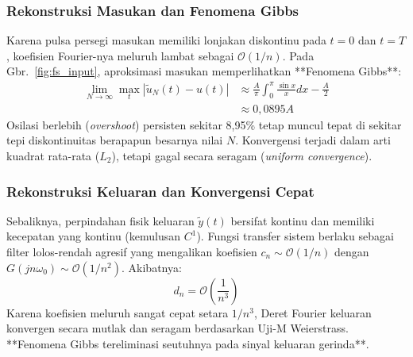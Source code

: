 \documentclass[journal]{IEEEtran}
\begin{document}
\subsubsection{Rekonstruksi Masukan dan Fenomena Gibbs}
Karena pulsa persegi masukan memiliki lonjakan diskontinu pada $t = 0$ dan $t = T$, koefisien Fourier-nya meluruh lambat sebagai $\mathcal{O}(1/n)$. Pada Gbr.~\ref{fig:fs_input}, aproksimasi masukan memperlihatkan **Fenomena Gibbs**:
\begin{align}
    \lim_{N \to \infty} \max_{t} |\tilde{u}_N(t) - u(t)| &\approx \frac{A}{\pi} \int_0^\pi \frac{\sin x}{x} dx - \frac{A}{2} \nonumber \\
    &\approx 0{,}0895 A
\end{align}
Osilasi berlebih (\textit{overshoot}) persisten sekitar 8,95\% tetap muncul tepat di sekitar tepi diskontinuitas berapapun besarnya nilai $N$. Konvergensi terjadi dalam arti kuadrat rata-rata ($L_2$), tetapi gagal secara seragam (\textit{uniform convergence}).

\subsubsection{Rekonstruksi Keluaran dan Konvergensi Cepat}
Sebaliknya, perpindahan fisik keluaran $\tilde{y}(t)$ bersifat kontinu dan memiliki kecepatan yang kontinu (kemulusan $C^1$). Fungsi transfer sistem berlaku sebagai filter lolos-rendah agresif yang mengalikan koefisien $c_n \sim \mathcal{O}(1/n)$ dengan $G(j n \omega_0) \sim \mathcal{O}(1/n^2)$. Akibatnya:
\begin{equation}
    d_n = \mathcal{O}\left(\frac{1}{n^3}\right)
\end{equation}
Karena koefisien meluruh sangat cepat setara $1/n^3$, Deret Fourier keluaran konvergen secara mutlak dan seragam berdasarkan Uji-M Weierstrass. **Fenomena Gibbs tereliminasi seutuhnya pada sinyal keluaran gerinda**.
\end{document}
